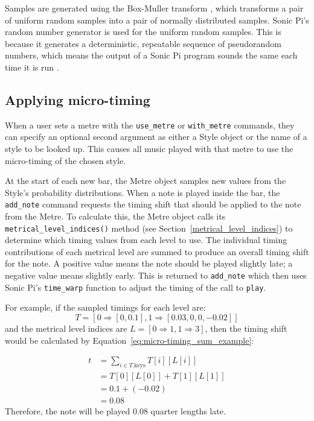\documentclass[12pt,twoside,openright]{report}
\begin{document}
Samples are generated using the
Box-Muller transform \cite{box1958}, which transforms a pair of uniform random
samples into a pair of normally distributed samples. Sonic Pi's random number
generator is used for the uniform random samples. This is because it generates a
deterministic, repeatable sequence of pseudorandom numbers, which means the output of
a Sonic Pi program sounds the same each time it is run \cite{aaron2016}.


\subsection{Applying micro-timing} \label{applying_micro-timing}

When a user sets a metre with the \verb'use_metre' or \verb'with_metre' commands, they can
specify an optional second argument as either a Style object or the name of a
style to be looked up. This causes all music played with that metre to use the
micro-timing of the chosen style.

At the start of each new bar, the Metre object samples new values from the
Style's probability distributions. When a note is played inside the bar, the
\verb'add_note' command requests the timing shift that should be applied to the note
from the Metre. To calculate this, the Metre object calls its
\verb'metrical_level_indices()' method (see Section~\ref{metrical_level_indices}) to determine which timing
values from each level to use. The individual timing contributions of each
metrical level are summed to produce an overall timing shift for the
note. A positive value means the note should be played slightly late; a negative
value means slightly early. This is returned to \verb'add_note' which then uses Sonic Pi's \verb'time_warp' function to adjust the timing of the call to \verb'play'.

For example, if the sampled timings for each level are:
\[ T=[0\Rightarrow[0,0.1],1\Rightarrow[0.03,0,0,-0.02]] \]
and the metrical level indices are $L=[0\Rightarrow1,1\Rightarrow3]$, then the timing shift would be
calculated by Equation~\ref{eq:micro-timing_sum_example}:

\begin{equation}
    \begin{split}
        t &= \sum_{i \in T.\mathrm{keys}} T[i][L[i]] \\
        &=T[0][L[0]]+T[1][L[1]] \\
        &=0.1+(-0.02) \\
        &=0.08
    \end{split}
    \label{eq:micro-timing_sum_example}
\end{equation}
Therefore, the note will be played 0.08 quarter lengths late.
\end{document}
